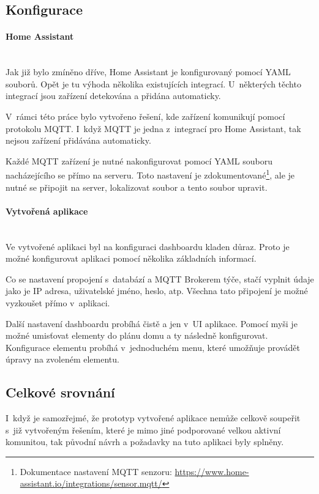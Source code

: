\subsection*{Konfigurace}
\paragraph*{Home Assistant}\mbox{} \\
Jak již bylo zmíněno dříve, Home Assistant je konfigurovaný pomocí YAML souborů. Opět je tu výhoda několika existujících integrací. U~některých těchto integrací jsou zařízení detekována a přidána automaticky. 

V~rámci této práce bylo vytvořeno řešení, kde zařízení komunikují pomocí protokolu MQTT. I~když MQTT je jedna z~integrací pro Home Assistant, tak nejsou zařízení přidávána automaticky. 

Každé MQTT zařízení je nutné nakonfigurovat pomocí YAML souboru nacházejícího se přímo na serveru. Toto nastavení je zdokumentované\footnote{Dokumentace nastavení MQTT senzoru: \url{https://www.home-assistant.io/integrations/sensor.mqtt/}}, ale je nutné se připojit na server, lokalizovat soubor a tento soubor upravit.

\paragraph*{Vytvořená aplikace}\mbox{} \\
Ve vytvořené aplikaci byl na konfiguraci dashboardu kladen důraz. Proto je možné konfigurovat aplikaci pomocí několika základních informací. 

Co se nastavení propojení s~databází a MQTT Brokerem týče, stačí vyplnit údaje jako je IP adresa, uživatelské jméno, heslo, atp. Všechna tato připojení je možné vyzkoušet přímo v~aplikaci.

Další nastavení dashboardu probíhá čistě a jen v~UI aplikace. Pomocí myši je možné umisťovat elementy do plánu domu a ty následně konfigurovat. Konfigurace elementu probíhá v~jednoduchém menu, které umožňuje provádět úpravy na zvoleném elementu.

\subsection*{Celkové srovnání}
I~když je samozřejmé, že prototyp vytvořené aplikace nemůže celkově soupeřit s~již vytvořeným řešením, které je mimo jiné podporované velkou aktivní komunitou, tak původní návrh a požadavky na tuto aplikaci byly splněny.

